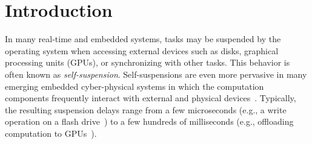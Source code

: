 \section{Introduction}

In many real-time and embedded systems, tasks may be suspended by the operating system when accessing external devices such as disks, graphical processing units (GPUs), or synchronizing with other tasks. 
This behavior is often known as \emph{self-suspension}. Self-suspensions are even more pervasive in many emerging embedded cyber-physical systems in which the computation components frequently interact with external and physical devices~\cite{Kang:rtss07,kato2011rgem}. Typically, the resulting suspension delays range from a few microseconds (e.g., a write operation on a flash drive~\cite{Kang:rtss07}) to a few hundreds of milliseconds (e.g., offloading computation to GPUs~\cite{kato2011rgem,DBLP:conf/dac/LiuCTKD14}).


  